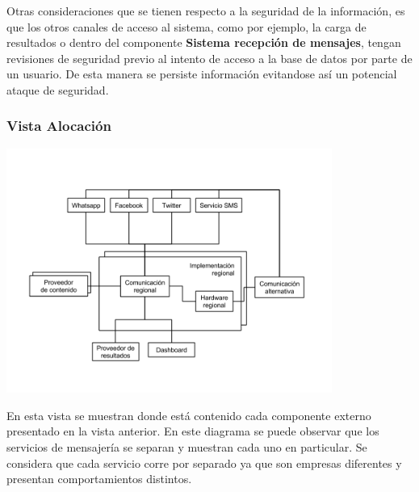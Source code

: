 \documentclass[a4paper, 11pt]{article}
\begin{document}
Otras consideraciones que se tienen respecto a la seguridad de la información, es que los otros canales de acceso al sistema, como por ejemplo, la carga de resultados o dentro del componente \textbf{Sistema recepción de mensajes}, tengan revisiones de seguridad previo al intento de acceso a la base de datos por parte de un usuario. De esta manera se persiste información evitandose así un potencial ataque de seguridad.\\


\newpage
\subsubsection{Vista Alocación}

\centerline{\includegraphics[width=0.8\textwidth]{./diagramas/VistaAlocacion.png}}

En esta vista se muestran donde está contenido cada componente externo presentado en la vista anterior. En este diagrama se puede observar que los servicios de mensajería se separan y muestran cada uno en particular. Se considera que cada servicio corre por separado ya que son empresas diferentes y presentan comportamientos distintos.\\
\end{document}
